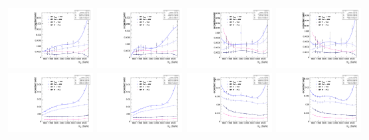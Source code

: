 \begin{figure}[htbp]
  \centering
  \includegraphics[width=0.2\textwidth]{fig/analysis/paramSignalYield_VBFSig_mu_HP_bb_DEtaLo.pdf}
  \includegraphics[width=0.2\textwidth]{fig/analysis/paramSignalYield_VBFSig_e_HP_bb_DEtaLo.pdf}
  \includegraphics[width=0.2\textwidth]{fig/analysis/paramSignalYield_VBFSig_mu_LP_bb_DEtaLo.pdf}
  \includegraphics[width=0.2\textwidth]{fig/analysis/paramSignalYield_VBFSig_e_LP_bb_DEtaLo.pdf}\\
  \includegraphics[width=0.2\textwidth]{fig/analysis/paramSignalYield_VBFSig_mu_HP_nobb_DEtaLo.pdf}
  \includegraphics[width=0.2\textwidth]{fig/analysis/paramSignalYield_VBFSig_e_HP_nobb_DEtaLo.pdf}
  \includegraphics[width=0.2\textwidth]{fig/analysis/paramSignalYield_VBFSig_mu_LP_nobb_DEtaLo.pdf}
  \includegraphics[width=0.2\textwidth]{fig/analysis/paramSignalYield_VBFSig_e_LP_nobb_DEtaLo.pdf}\\

\end{figure}
